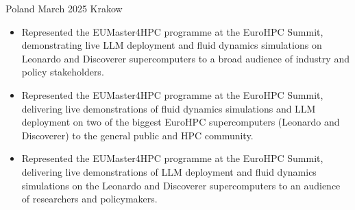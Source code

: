 {Poland}
{March 2025}
{Krakow}
{\footnotesize\faCode \hspace{1pt}
}

\begin{itemize}

    \ifde
        \item Represented the EUMaster4HPC programme at the EuroHPC Summit, demonstrating live LLM deployment and fluid dynamics simulations on Leonardo and Discoverer supercomputers to a broad audience of industry and policy stakeholders.
    \else
        \ifhpc
            \item Represented the EUMaster4HPC programme at the EuroHPC Summit, delivering live demonstrations of fluid dynamics simulations and LLM deployment on two of the biggest EuroHPC supercomputers (Leonardo and Discoverer) to the general public and HPC community.
        \else
            \item Represented the EUMaster4HPC programme at the EuroHPC Summit, delivering live demonstrations of LLM deployment and fluid dynamics simulations on the Leonardo and Discoverer supercomputers to an audience of researchers and policymakers.
        \fi
    \fi

\end{itemize}

\medskip
